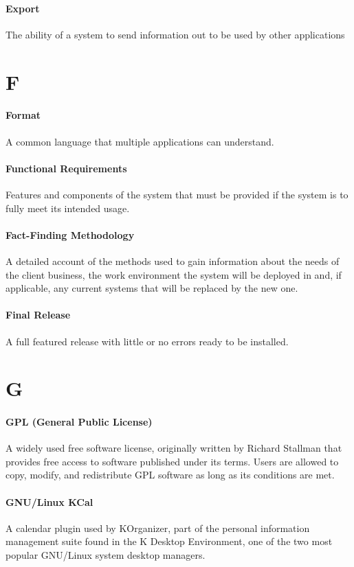 \documentclass[letterpaper,12pt]{report}
\begin{document}
\paragraph{Export} The ability of a system to send information out to be used by other applications 
\section*{F}
\paragraph{Format} A common language that multiple applications can understand. 
\paragraph{Functional Requirements} Features and components of the system that must be provided if the system is to fully meet its intended usage.
\paragraph{Fact-Finding Methodology} A detailed account of the methods used to gain information about the needs of the client business, the work environment the system will be deployed in and, if applicable, any current systems that will be replaced by the new one.
\paragraph{Final Release} A full featured release with little or no errors ready to be installed.
\section*{G}
\paragraph{GPL (General Public License)} A widely used free software license, originally written by Richard Stallman that provides free access to software published under its terms. Users are allowed to copy, modify, and redistribute GPL software as long as its conditions are met.
\paragraph{GNU/Linux KCal} A calendar plugin used by KOrganizer, part of the personal information management suite found in the K Desktop Environment, one of the two most popular GNU/Linux system desktop managers.
\end{document}
